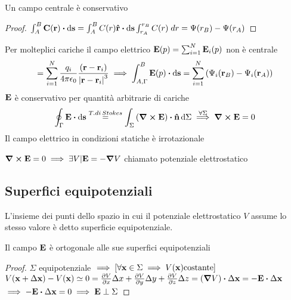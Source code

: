 \documentclass[12pt,a4paper]{article}
\begin{document}
\begin{proposition}
    Un campo centrale è conservativo 
\end{proposition}
\begin{proof}
    $\int_{A}^{B}\vb{C}(\vb{r})\vdot \dd{\vb{s}}=\int_{A}^{B}C(r)\vu{r}\vdot \dd{\vb{s}}\int_{r_A}^{r_B}C(r)\;dr= \Psi(r_B)-\Psi(r_A)$
\end{proof}
Per molteplici cariche il campo elettrico $\vb{E}(p)= \sum_{i=1}^{N} \vb{E}_i(p) $ non è centrale
\begin{equation*}
    = \sum_{i=1}^{N}\frac{q_i}{4\pi\epsilon_0}\frac{(\vb{r}-\vb{r}_i)}{\abs{\vb{r}-\vb{r}_i}^3}\implies\int_{A,\Gamma}^{B}\vb{E}(p)\vdot \dd{\vb{s}}
    =\sum_{i=1}^{N}\left( \Psi_i(\vb{r}_B)-\Psi_i(\vb{r}_A) \right) 
\end{equation*}
$\vb{E}$ è conservativo per quantità arbitrarie di cariche
\begin{equation*}
    \oint_\Gamma \vb{E}\vdot \dd{\vb{s}} \overset{T.di\,Stokes}{=}\int_{\Sigma} \left( \curl \vb{E} \right)\vdot \vu{n}\dd{\Sigma}
    \overset{\forall\Sigma}{\implies}\curl\vb{E}=0
\end{equation*}
Il campo elettrico in condizioni statiche è irrotazionale
\begin{definition}
    $\curl\vb{E}=0\implies \exists V | \vb{E}=- \grad V$ chiamato potenziale elettrostatico
\end{definition}

\subsection{Superfici equipotenziali}
\begin{definition}
    L'insieme dei punti dello spazio in cui il potenziale elettrostatico $V$ assume lo stesso valore
    è detto superficie equipotenziale.   
\end{definition}

\begin{proposition}
    Il campo $\vb{E}$ è ortogonale alle sue superfici equipotenziali
\end{proposition}
\begin{proof}
    $\Sigma$ equipotenziale $\implies\left[ \forall \vb{x} \in\Sigma \implies V(\vb{x}) \text{costante} \right]$
    \\$V(\vb{x}+\Delta\vb{x})-V(\vb{x})\simeq0=\pdv{V}{x}\Delta x+\pdv{V}{y}\Delta y+\pdv{V}{z}\Delta z= (\grad V)\vdot\Delta\vb{x}= - \vb{E}\vdot\Delta\vb{x}$
    \\$\implies-\vb{E}\vdot\Delta\vb{x}=0\implies\vb{E}\perp\Sigma$
\end{proof}
\end{document}
